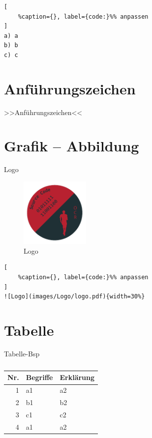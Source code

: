 \lstset{language=Bash}%
\begin{lstlisting}[
	%caption={}, label={code:}%% anpassen
]
a) a
b) b
c) c
\end{lstlisting}

\section{Anführungszeichen}\label{anfuehrungszeichen}

>>Anführungszeichen<<

\section{Grafik -- Abbildung}\label{grafik-abbildung}

Logo %

\begin{figure}[!ht]%
\centering
\includegraphics[width=0.3\textwidth]{images/Logo/logo.pdf}
\caption{Logo}
\end{figure}

\lstset{language=Bash}%
\begin{lstlisting}[
	%caption={}, label={code:}%% anpassen
]
![Logo](images/Logo/logo.pdf){width=30%}
\end{lstlisting}

\section{Tabelle}\label{tabelle}

Tabelle-Bsp %

\begin{table}[!ht]%
\centering 
	\caption{}%
\begin{tabular}{@{}rll@{}}
\hline
\textbf{Nr.} & \textbf{Begriffe} & \textbf{Erklärung} \\
\hline
1 & a1 & a2 \\
2 & b1 & b2 \\
3 & c1 & c2 \\
4 & a1 & a2 \\
\hline
\end{tabular} 
\end{table}

